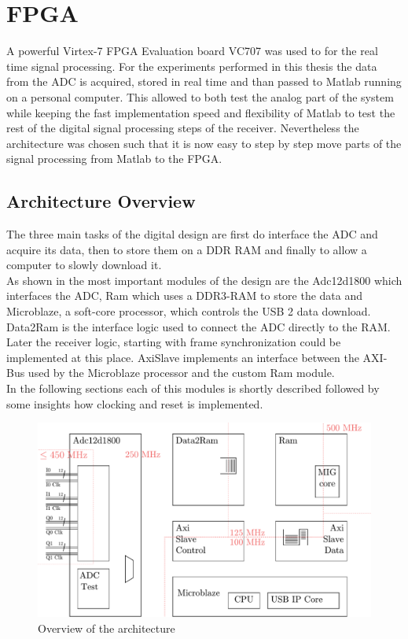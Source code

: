\chapter{FPGA}
\label{chap:fpga}
A powerful Virtex-7 \gls{FPGA} Evaluation board VC707
was used to for the real time signal processing.
For the experiments performed in this thesis
the data from the \gls{ADC} is acquired, stored in real time
and than passed to Matlab running on a personal computer.
This allowed to both test the analog part of the system
while keeping the fast implementation speed and flexibility of Matlab
to test the rest of the digital signal processing steps of the receiver.
Nevertheless the architecture was chosen such that it is now easy
to step by step move parts of the signal processing from Matlab to the
\gls{FPGA}. \\

\section{Architecture Overview}
The three main tasks of the digital design are first do interface
the \gls{ADC} and acquire its data, then to store them on a
\gls{DDR} \gls{RAM} and finally to allow a computer to
slowly download it. \\

As shown in  the most important
modules of the design are the Adc12d1800 which interfaces the
\gls{ADC}, Ram which uses a \gls{DDR}3-\gls{RAM} to store the data
and Microblaze, a soft-core processor, which controls the
\gls{USB} 2 data download. Data2Ram is the interface logic used
to connect the \gls{ADC} directly to the \gls{RAM}. Later the receiver logic,
starting with frame synchronization could be implemented
at this place. AxiSlave implements an interface between the
\acrshort{AXI}-Bus used by the Microblaze processor and the custom
Ram module. \\

In the following sections each of this modules is shortly described followed
by some insights how clocking and reset is implemented. \\

\begin{figure}[ht]
  \centering
  \includegraphics[width=\textwidth]{figures/fpga_architecture_overview}
  \caption{Overview of the architecture}
  \label{fig:fpga_architecture_overview}
\end{figure}

